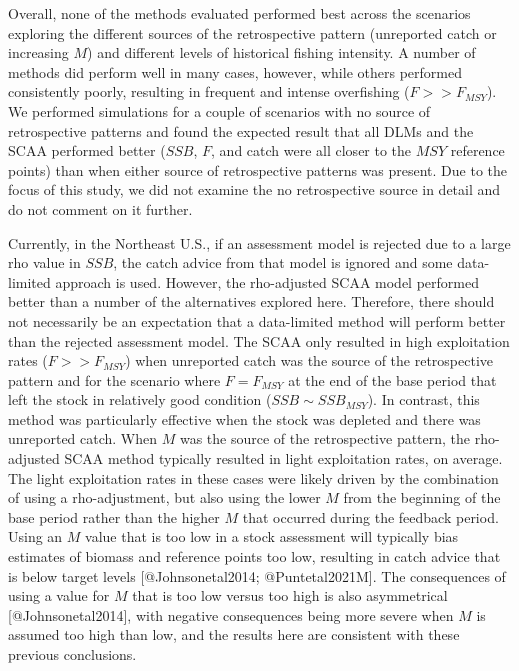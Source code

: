 \documentclass[
]{article}
\begin{document}
Overall, none of the methods evaluated performed best across the scenarios exploring the different sources of the retrospective pattern (unreported catch or increasing \(M\)) and different levels of historical fishing intensity. A number of methods did perform well in many cases, however, while others performed consistently poorly, resulting in frequent and intense overfishing (\(F>>F_{MSY}\)). We performed simulations for a couple of scenarios with no source of retrospective patterns and found the expected result that all DLMs and the SCAA performed better (\(SSB\), \(F\), and catch were all closer to the \(MSY\) reference points) than when either source of retrospective patterns was present. Due to the focus of this study, we did not examine the no retrospective source in detail and do not comment on it further.

Currently, in the Northeast U.S., if an assessment model is rejected due to a large rho value in \(SSB\), the catch advice from that model is ignored and some data-limited approach is used. However, the rho-adjusted SCAA model performed better than a number of the alternatives explored here. Therefore, there should not necessarily be an expectation that a data-limited method will perform better than the rejected assessment model. The SCAA only resulted in high exploitation rates (\(F >> F_{MSY}\)) when unreported catch was the source of the retrospective pattern and for the scenario where \(F=F_{MSY}\) at the end of the base period that left the stock in relatively good condition (\(SSB \sim SSB_{MSY}\)). In contrast, this method was particularly effective when the stock was depleted and there was unreported catch. When \(M\) was the source of the retrospective pattern, the rho-adjusted SCAA method typically resulted in light exploitation rates, on average. The light exploitation rates in these cases were likely driven by the combination of using a rho-adjustment, but also using the lower \(M\) from the beginning of the base period rather than the higher \(M\) that occurred during the feedback period. Using an \(M\) value that is too low in a stock assessment will typically bias estimates of biomass and reference points too low, resulting in catch advice that is below target levels {[}@Johnsonetal2014; @Puntetal2021M{]}. The consequences of using a value for \(M\) that is too low versus too high is also asymmetrical {[}@Johnsonetal2014{]}, with negative consequences being more severe when \(M\) is assumed too high than low, and the results here are consistent with these previous conclusions.
\end{document}
